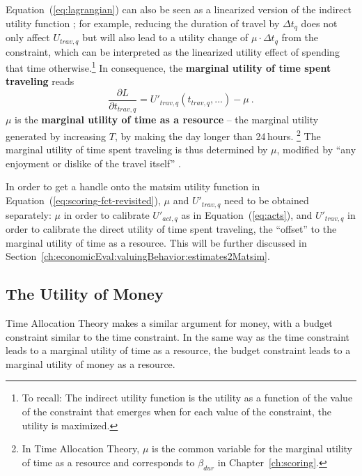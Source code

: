 Equation~(\ref{eq:lagrangian}) can also be seen as a linearized version of the indirect utility function%
%
%
%
; for example, reducing the duration of travel by $\Delta t_q$ does not only affect $U_{trav,q}$ but will also lead to a utility change of $ \mu \cdot \Delta t_q$ from the constraint, which can be interpreted as the linearized utility effect of spending that time otherwise.\footnote{%
%
To recall: The indirect utility function is the utility as a function of the value of the constraint that emerges when for each value of the constraint, the utility is maximized.
%
}
%
In consequence, the \textbf{marginal utility of time spent traveling} reads
%
\begin{equation}
\frac{\partial L}{\partial t_{trav,q}} = U'_{trav,q}(t_{trav,q},...) - \mu \ .
\label{eq:marg-UoT}
\end{equation}
%
$\mu$ is the \textbf{marginal utility of time as a resource} -- the marginal utility generated by increasing $T$, \ie by making the day longer than 24\,hours.%
%
\footnote{
%
In Time Allocation Theory, $\mu$ is the common variable for the marginal utility of time as a resource and corresponds to $\beta_{dur}$ in Chapter~\ref{ch:scoring}.
%
}
%
The marginal utility of time spent traveling is thus determined by $\mu$, modified by ``any enjoyment or dislike of the travel itself'' \citep{Small2012ValuationOfTimeRevisited}.

In order to get a handle onto the \acrshort{matsim} utility function in Equation~(\ref{eq:scoring-fct-revisited}), $\mu$ and $U'_{trav,q}$ need to be obtained separately: $\mu$ in order to calibrate $U'_{act,q}$ as in Equation~(\ref{eq:acts}), and $U'_{trav,q}$ in order to calibrate the direct utility of time spent traveling, the ``offset'' to the marginal utility of time as a resource.
%
This will be further discussed in Section~\ref{ch:economicEval:valuingBehavior:estimates2Matsim}.


\subsection{The Utility of Money}
\label{ch:economicEval:valuingBehavior:uom}
Time Allocation Theory \citep{DeSerpa1997economicsOfTime, Jara-DiazGuevara-2003} makes a similar argument for money, with a budget constraint similar to the time constraint.
%
In the same way as the time constraint leads to a marginal utility of time as a resource, the budget constraint leads to a marginal utility of money as a resource.


